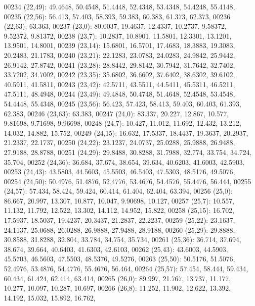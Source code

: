 \begin{DoxyCode}
00234       (22,49): 49.4648, 50.4548, 51.4448, 52.4348, 53.4348, 54.4248, 55.4148,
00235       (22,56): 56.413, 57.403, 58.393, 59.383, 60.383, 61.373, 62.373,
00236       (22,63): 63.363,
00237       (23,0): 80.0037, 19.4637, 12.4337, 10.2737, 9.58372, 9.52372, 9.81372,
00238       (23,7): 10.2837, 10.8901, 11.5801, 12.3301, 13.1201, 13.9501, 14.8001,
00239       (23,14): 15.6801, 16.5701, 17.4683, 18.3883, 19.3083, 20.2483, 21.1783,
00240       (23,21): 22.1283, 23.0783, 24.0283, 24.9842, 25.9442, 26.9142, 27.8742,
00241       (23,28): 28.8442, 29.8142, 30.7942, 31.7642, 32.7402, 33.7202, 34.7002,
00242       (23,35): 35.6802, 36.6602, 37.6402, 38.6302, 39.6102, 40.5911, 41.5811,
00243       (23,42): 42.5711, 43.5511, 44.5411, 45.5311, 46.5211, 47.5111, 48.4948,
00244       (23,49): 49.4848, 50.4748, 51.4648, 52.4548, 53.4548, 54.4448, 55.4348,
00245       (23,56): 56.423, 57.423, 58.413, 59.403, 60.403, 61.393, 62.383,
00246       (23,63): 63.383,
00247       (24,0): 83.337, 20.227, 12.867, 10.577, 9.81698, 9.71698, 9.96698,
00248       (24,7): 10.427, 11.012, 11.692, 12.432, 13.212, 14.032, 14.882, 15.752,
00249       (24,15): 16.632, 17.5337, 18.4437, 19.3637, 20.2937, 21.2337, 22.1737,
00250       (24,22): 23.1237, 24.0737, 25.0288, 25.9888, 26.9488, 27.9188, 28.8788,
00251       (24,29): 29.8488, 30.8288, 31.7988, 32.774, 33.754, 34.724, 35.704,
00252       (24,36): 36.684, 37.674, 38.654, 39.634, 40.6203, 41.6003, 42.5903,
00253       (24,43): 43.5803, 44.5603, 45.5503, 46.5403, 47.5303, 48.5176, 49.5076,
00254       (24,50): 50.4976, 51.4876, 52.4776, 53.4676, 54.4576, 55.4476, 56.444,
00255       (24,57): 57.434, 58.424, 59.424, 60.414, 61.404, 62.404, 63.394,
00256       (25,0): 86.667, 20.997, 13.307, 10.877, 10.047, 9.90698, 10.127,
00257       (25,7): 10.557, 11.132, 11.792, 12.522, 13.302, 14.112, 14.952, 15.822,
00258       (25,15): 16.702, 17.5937, 18.5037, 19.4237, 20.3437, 21.2837, 22.2237,
00259       (25,22): 23.1637, 24.1137, 25.0688, 26.0288, 26.9888, 27.9488, 28.9188,
00260       (25,29): 29.8888, 30.8588, 31.8288, 32.804, 33.784, 34.754, 35.734,
00261       (25,36): 36.714, 37.694, 38.674, 39.664, 40.6403, 41.6303, 42.6103,
00262       (25,43): 43.6003, 44.5903, 45.5703, 46.5603, 47.5503, 48.5376, 49.5276,
00263       (25,50): 50.5176, 51.5076, 52.4976, 53.4876, 54.4776, 55.4676, 56.464,
00264       (25,57): 57.454, 58.444, 59.434, 60.434, 61.424, 62.414, 63.414,
00265       (26,0): 89.997, 21.767, 13.737, 11.177, 10.277, 10.097, 10.287, 10.697,
00266       (26,8): 11.252, 11.902, 12.622, 13.392, 14.192, 15.032, 15.892, 16.762,

\end{DoxyCode}

